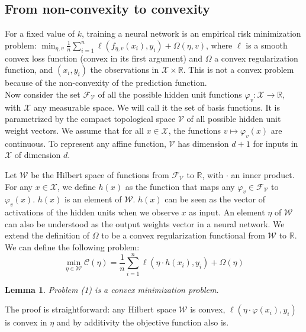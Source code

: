 \documentclass[a4paper, 11pt]{scrartcl}
\newtheorem{lemma}[theorem]{Lemma}
\begin{document}
\subsection{From non-convexity to convexity}

For a fixed value of $k$, training a neural network is an empirical risk minimization problem: $\min_{\eta, v} \frac{1}{n} \sum_{i=1}^n \ell(f_{\eta, v}(x_i), y_i) + \Omega(\eta, v)$, where $\ell$ is a smooth convex loss function (convex in its first argument) and $\Omega$ a convex regularization function, and $(x_i, y_i)$ the observations in $\mathcal{X} \times \mathbb{R}$. This is not a convex problem because of the non-convexity of the prediction function.\\

Now consider the set $\mathcal{F}_\mathcal{V}$ of all the possible hidden unit functions $\varphi_v : \mathcal{X} \rightarrow \mathbb{R}$, with $\mathcal{X}$ any measurable space. We will call it the set of basis functions. It is parametrized by the compact topological space $\mathcal{V}$ of all possible hidden unit weight vectors. We assume that for all $x \in \mathcal{X}$, the functions $v \mapsto \varphi_v(x)$ are continuous. To represent any affine function, $\mathcal{V}$ has dimension $d + 1$ for inputs in $\mathcal{X}$ of dimension $d$.

Let $\mathcal{W}$ be the Hilbert space of functions from $\mathcal{F}_\mathcal{V}$ to $\mathbb{R}$, with $\cdot$ an inner product. For any $x \in \mathcal{X}$, we define $h(x)$ as the function that maps any $\varphi_v \in \mathcal{F}_\mathcal{V}$ to $\varphi_v(x)$. $h(x)$ is an element of $\mathcal{W}$. $h(x)$ can be seen as the vector of activations of the hidden units when we observe $x$ as input. An element $\eta$ of $\mathcal{W}$ can also be understood as the output weights vector in a neural network. We extend the definition of $\Omega$ to be a convex regularization functional from $\mathcal{W}$ to $\mathbb{R}$.  \\

We can define the following problem:
\begin{equation}
\min_{\eta \in \mathcal{W}} \mathcal{C}(\eta) = \frac{1}{n} \sum_{i=1}^n \ell(\eta \cdot h(x_i), y_i) + \Omega(\eta)
\end{equation}

\begin{lemma}
Problem (1) is a convex minimization problem.
\end{lemma}
The proof is straightforward: any Hilbert space $\mathcal{W}$ is convex, $ \ell(\eta \cdot \varphi(x_i), y_i)$ is convex in $\eta$ and by additivity the objective function also is.\\
\end{document}

